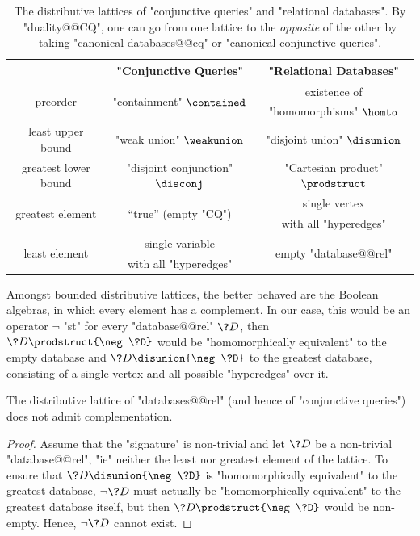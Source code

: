 \begin{table}
	\centering
	\begin{tabular}{ccc}
		\toprule
		 & "Conjunctive Queries" & "Relational Databases" \\ \midrule
		\multirow{2}{*}{preorder} & \multirow{2}{*}{"containment" $\contained$} & existence of\\
		& & "homomorphisms" $\homto$ \\
		least upper bound & "weak union" $\weakunion$ & "disjoint union" $\disunion$ \\
		greatest lower bound & "disjoint conjunction" $\disconj$ & "Cartesian product" $\prodstruct$ \\ 
		\multirow{2}{*}{greatest element} & \multirow{2}{*}{``true'' (empty "CQ")} & single vertex \\
		& & with all "hyperedges" \\
		\multirow{2}{*}{least element} & single variable & \multirow{2}{*}{empty "database@@rel"}
		\\
		& with all "hyperedges" & \\ \bottomrule
	\end{tabular}
	\caption{
		\AP\label{tab:distributive-lattices}
		The distributive lattices of "conjunctive queries" and "relational databases".
		By "duality@@CQ", one can go from one lattice to the \emph{opposite} of the other
		by taking "canonical databases@@cq" or "canonical conjunctive queries".}
\end{table}

Amongst bounded distributive lattices, the better behaved are
the Boolean algebras, in which every element has a complement.
In our case, this would be an operator $\neg$ "st" for every "database@@rel" $\?D$,
then $\?D \prodstruct {\neg \?D}$ would be "homomorphically equivalent" to
the empty database and $\?D \disunion {\neg \?D}$ to the greatest database,
consisting of a single vertex and all possible "hyperedges" over it.

\begin{proposition}
	The distributive lattice of "databases@@rel" (and hence of
	"conjunctive queries") does not admit complementation.
\end{proposition}

\begin{proof}
	Assume that the "signature" is non-trivial and let $\?D$ be a non-trivial "database@@rel",
	"ie" neither the least nor greatest element of the lattice.
	To ensure that $\?D \disunion {\neg \?D}$ is "homomorphically equivalent"
	to the greatest database, $\neg \?D$ must actually be "homomorphically equivalent" to 
	the greatest database itself,
	but then $\?D \prodstruct {\neg \?D}$ would be non-empty.
	Hence, $\neg \?D$ cannot exist.
\end{proof}

